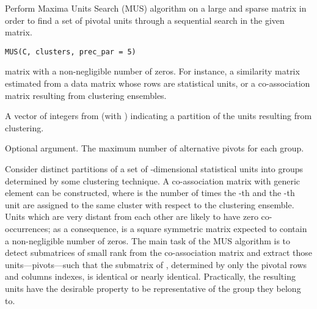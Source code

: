 \documentclass[a4paper]{book}
\begin{document}
%
\begin{Description}\relax
Perform Maxima Units Search (MUS) algorithm on a large and sparse matrix in
order to find a set of pivotal units through a sequential search
in the given matrix.
\end{Description}
%
\begin{Usage}
\begin{verbatim}
MUS(C, clusters, prec_par = 5)
\end{verbatim}
\end{Usage}
%
\begin{Arguments}
\begin{ldescription}
\item[\code{C}]  matrix with a non-negligible number of zeros.
For instance, a similarity matrix estimated from a  data matrix whose rows
are statistical units, or a co-association matrix resulting from clustering
ensembles.

\item[\code{clusters}] A vector of integers from  (with )
indicating a partition of the  units resulting from clustering.

\item[\code{prec\_par}] Optional argument. The maximum number of alternative pivots for each group.
\end{ldescription}
\end{Arguments}
%
\begin{Details}\relax
Consider  distinct partitions of a set of  -dimensional
statistical units into 
groups determined by some
clustering technique.  A  co-association matrix
 with generic element  can be constructed,
where  is the number of times the -th and the -th unit
are assigned to the same cluster with respect to the clustering ensemble.
Units which are very distant
from each other are likely to have zero co-occurrences; as a consequence,
 is
a square symmetric matrix expected  to contain a non-negligible number of zeros.
The main task of the MUS algorithm is to detect submatrices of small
rank from the co-association matrix
and extract those units---pivots---such
that the  submatrix of ,
determined by only the pivotal rows
and columns indexes, is identical or nearly identical.
Practically, the resulting units
have the desirable property to be representative of
the group they belong to.
\end{Details}
\end{document}
